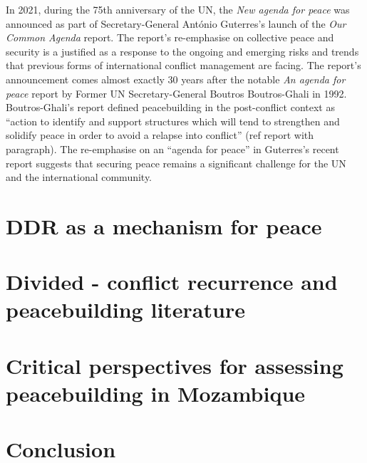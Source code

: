 In 2021, during the 75th anniversary of the UN, the \emph{New agenda for peace} was announced as part of Secretary-General Ant\'{o}nio Guterres's launch of the \emph{Our Common Agenda} report. The report's re-emphasise on collective peace and security is a justified as a response to the ongoing and emerging risks and trends that previous forms of international conflict management are facing. The report's announcement comes almost exactly 30 years after the notable \emph{An agenda for peace} report by Former UN Secretary-General Boutros Boutros-Ghali in 1992. Boutros-Ghali's report defined peacebuilding in the post-conflict context as ``action to identify and support structures which will tend to strengthen and solidify peace in order to avoid a relapse into conflict'' (ref report with paragraph).  The re-emphasise on an ``agenda for peace'' in Guterres's recent report suggests that securing peace remains a significant challenge for the UN and the international community. 









\section{DDR as a mechanism for peace}





\section{Divided - conflict recurrence and peacebuilding literature}





\section{Critical perspectives for assessing peacebuilding in Mozambique}





\section{Conclusion}